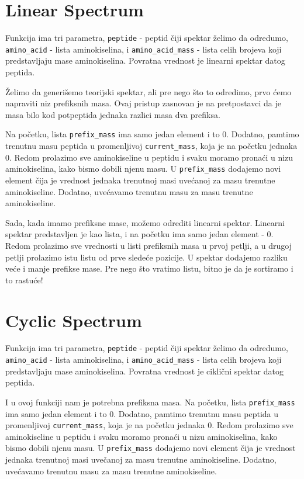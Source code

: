 \section{Linear Spectrum}
\label{linearSpectrum}
\setbookcodestyle 
Funkcija ima tri parametra, \texttt{peptide} - peptid čiji spektar želimo da odredumo, \texttt{amino\_acid} - lista aminokiselina, i \texttt{amino\_acid\_mass} - lista celih brojeva koji predstavljaju mase aminokiselina. Povratna vrednost je linearni spektar datog peptida. 

Želimo da generišemo teorijski spektar, ali pre nego što to odredimo, prvo ćemo napraviti niz prefiksnih masa. Ovaj pristup zasnovan je na pretpostavci da je masa bilo kod potpeptida jednaka razlici masa dva prefiksa. 

Na početku, lista \texttt{prefix\_mass} ima samo jedan element i to 0. Dodatno, pamtimo trenutnu masu peptida u promenljivoj \texttt{current\_mass}, koja je na početku jednaka 0. Redom prolazimo sve aminokiseline u peptidu i svaku moramo pronaći u nizu aminokiselina, kako bismo dobili njenu masu. U \texttt{prefix\_mass} dodajemo novi element čija je vrednost jednaka trenutnoj masi uvećanoj za masu trenutne aminokiseline. Dodatno, uvećavamo trenutnu masu za masu trenutne aminokiseline.

Sada, kada imamo prefiksne mase, možemo odrediti linearni spektar. Linearni spektar predstavljen je kao lista, i na početku ima samo jedan element - 0. Redom prolazimo sve vrednosti u listi prefiksnih masa u prvoj petlji, a u drugoj petlji prolazimo istu listu od prve sledeće pozicije. U spektar dodajemo razliku veće i manje prefikse mase. Pre nego što vratimo listu, bitno je da je sortiramo i to rastuće!




\section{Cyclic Spectrum}
\label{cyclicSpectrum}

Funkcija ima tri parametra, \texttt{peptide} - peptid čiji spektar želimo da odredumo, \texttt{amino\_acid} - lista aminokiselina, i \texttt{amino\_acid\_mass} - lista celih brojeva koji predstavljaju mase aminokiselina. Povratna vrednost je ciklični spektar datog peptida. 

I u ovoj funkciji nam je potrebna prefiksna masa. Na početku, lista \texttt{prefix\_mass} ima samo jedan element i to 0. Dodatno, pamtimo trenutnu masu peptida u promenljivoj \texttt{current\_mass}, koja je na početku jednaka 0. Redom prolazimo sve aminokiseline u peptidu i svaku moramo pronaći u nizu aminokiselina, kako bismo dobili njenu masu. U \texttt{prefix\_mass} dodajemo novi element čija je vrednost jednaka trenutnoj masi uvečanoj za masu trenutne aminokiseline. Dodatno, uvećavamo trenutnu masu za masu trenutne aminokiseline.

